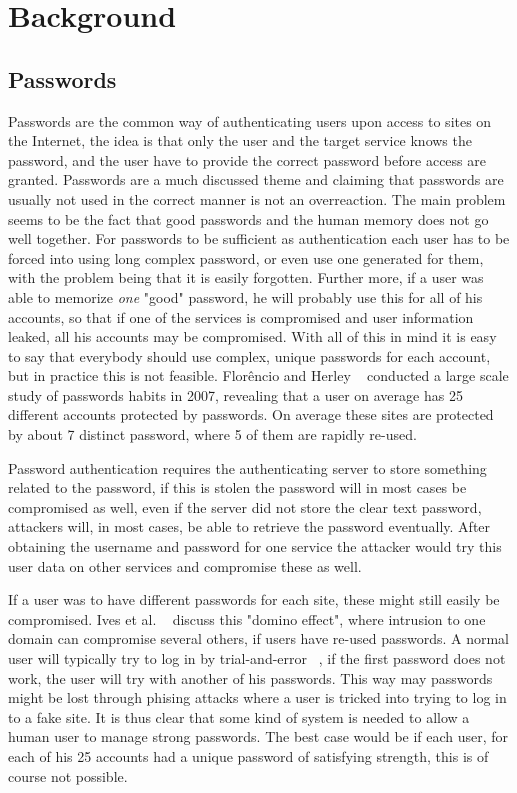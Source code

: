 \chapter{Background}\label{chp:background}


\section{Passwords}
Passwords are the common way of authenticating users upon access to sites on the Internet, the idea is that only the user and the target service knows the password, and the user have to provide the correct password before access are granted. Passwords are a much discussed theme and claiming that passwords are usually not used in the correct manner is not an overreaction. The main problem seems to be the fact that good passwords and the human memory does not go well together. For passwords to be sufficient as authentication each user has to be forced into using long complex password, or even use one generated for them, with the problem being that it is easily forgotten. Further more, if a user was able to memorize \emph{one} "good" password, he will probably use this for all of his accounts, so that if one of the services is compromised and user information leaked, all his accounts may be compromised. With all of this in mind it is easy to say that everybody should use complex, unique passwords for each account, but in practice this is not feasible. Florêncio and Herley ~\cite{password-habits} conducted a large scale study of passwords habits in 2007, revealing that a user on average has 25 different accounts protected by passwords. On average these sites are protected by about 7 distinct password, where 5 of them are rapidly re-used.
\par Password authentication requires the authenticating server to store something related to the password, if this is stolen the password will in most cases be compromised as well, even if the server did not store the clear text password, attackers will, in most cases, be able to retrieve the password eventually. After obtaining the username and password for one service the attacker would try this user data on other services and compromise these as well. 
\par If a user was to have different passwords for each site, these might still easily be compromised. Ives et al. ~\cite{domino-effect} discuss this "domino effect", where intrusion to one domain can compromise several others, if users have re-used passwords.  A normal user will typically try to log in by trial-and-error ~\cite{single-pw-auth}, if the first password does not work, the user will try with another of his passwords. This way may passwords might be lost through phising attacks where a user is tricked into trying to log in to a fake site. It is thus clear that some kind of system is needed to allow a human user to manage strong passwords. The best case would be if each user, for each of his 25 accounts had a unique password of satisfying strength, this is of course not possible.

